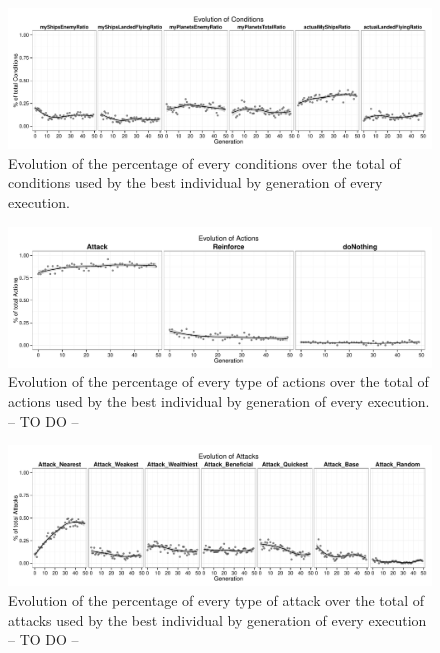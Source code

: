 \documentclass[preprint]{elsarticle}
\begin{document}
 \begin{figure}[ht]
 \begin{center}
   \includegraphics[width=12cm]{nuevas_imgs/estudio_CONDITIONS.pdf}
 \end{center}
 \caption{Evolution of the percentage of every conditions over the total of conditions used by the best individual by generation of every execution.}
 \label{figura:e_conditions}
 \end{figure}

 \begin{figure}[ht]
 \begin{center}
   \includegraphics[width=12cm]{nuevas_imgs/estudio_ACTIONS.pdf}
 \end{center}
 \caption{Evolution of the percentage of every type of actions over the total of actions used by the best individual by generation of every execution. -- TO DO -- %
 }
 \label{figura:e_actions}
 \end{figure}

 \begin{figure}[ht]
 \begin{center}
   \includegraphics[width=12cm]{nuevas_imgs/estudio_ATTACKS.pdf}
 \end{center}
 \caption{Evolution of the percentage of every type of attack over the total of attacks used by the best individual by generation of every execution -- TO DO -- %
 }
 \label{figura:e_attacks}
 \end{figure}
\end{document}
